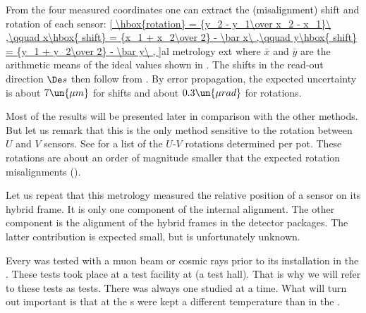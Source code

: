 
From the four measured coordinates one can extract the (misalignment) shift and rotation of each sensor:
\eqref{
	\hbox{rotation} = {y_2 - y_1\over x_2 - x_1}\ ,\qquad
	x\hbox{ shift} = {x_1 + x_2\over 2} - \bar x\ ,\qquad
	y\hbox{ shift} = {y_1 + y_2\over 2} - \bar y\ ,
}{al metrology ext}
where $\bar x$ and $\bar y$ are the arithmetic means of the ideal values shown in . The shifts in the read-out direction $\De s$ then follow from . By error propagation, the expected uncertainty is about $7\un{\mu m}$ for shifts and about $0.3\un{\mu rad}$ for rotations.

Most of the results will be presented later in comparison with the other methods. But let us remark that this is the only method sensitive to the rotation between $U$ and $V$ sensors. See  for a list of the $U$-$V$ rotations determined per pot. These rotations are about an order of magnitude smaller that the expected rotation misalignments ().


Let us repeat that this metrology measured the relative position of a sensor on its hybrid frame. It is only one component of the internal alignment. The other component is the alignment of the hybrid frames in the detector packages. The latter contribution is expected small, but is unfortunately unknown.


Every  was tested with a muon beam or cosmic rays prior to its installation in the . These tests took place at a  test facility at  (a  test hall). That is why we will refer to these tests as  tests. There was always one  studied at a time. What will turn out important is that at  the s were kept a different temperature than in the .


